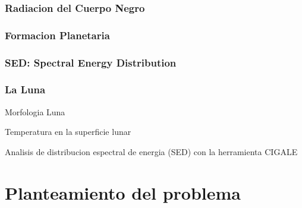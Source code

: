 \documentclass[12pt]{article}
\begin{document}
\subsubsection{Radiacion del Cuerpo Negro}


\subsubsection{Formacion Planetaria}

\subsubsection{SED: Spectral Energy Distribution}


\subsubsection{La Luna}
Morfologia Luna \cite{PhysicsandAstronomyMoon}

Temperatura en la superficie lunar \cite{Zhengling2024}

Analisis de distribucion espectral de energia (SED) con la herramienta CIGALE \cite{Boquien2019}

\section{Planteamiento del problema}

\printbibliography
\end{document}
